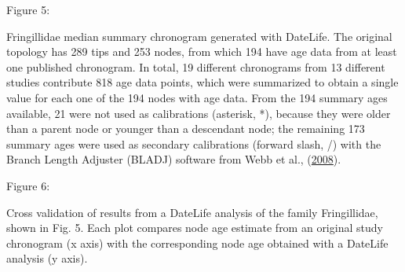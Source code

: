Figure 5:

Fringillidae median summary chronogram generated with DateLife. The original topology has 289 tips and 253 nodes, from which 194 have age data from at least one published chronogram. In total, 19 different chronograms from 13 different studies contribute 818 age data points, which were summarized to obtain a single value for each one of the 194 nodes with age data. From the 194 summary ages available, 21 were not used as calibrations (asterisk, *), because they were older than a parent node or younger than a descendant node; the remaining 173 summary ages were used as secondary calibrations (forward slash, /) with the Branch Length Adjuster (BLADJ) software from Webb et al., (\protect\hyperlink{ref-Webb2008}{2008}).



Figure 6:

Cross validation of results from a DateLife analysis of the family Fringillidae, shown in Fig. 5. Each plot compares node age estimate from an original study chronogram (x axis) with the corresponding node age obtained with a DateLife analysis (y axis).
